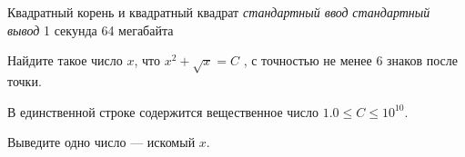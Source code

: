 \begin{problem}%
{Квадратный корень и квадратный квадрат}%
{\textsl{стандартный ввод}}%
{\textsl{стандартный вывод}}%
{1 секунда}%
{64 мегабайта}{}

Найдите такое число $x$, что $x^2 + \sqrt{x} = C$ , с точностью не менее $6$ знаков после точки.

\InputFile

В единственной строке содержится вещественное число $1.0 \le C \le 10^{10}$.

\OutputFile

Выведите одно число — искомый $x$.

\Examples

\begin{example}
%
%
\end{example}
\end{problem}